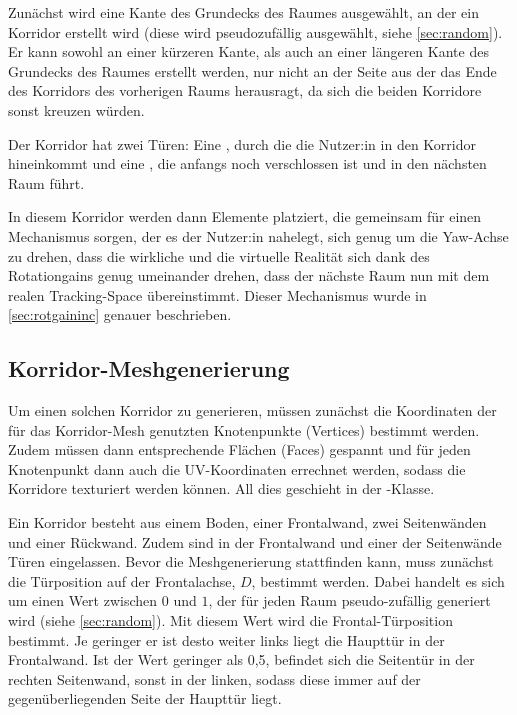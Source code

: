 Zunächst wird eine Kante des Grundecks des Raumes ausgewählt, an der ein Korridor erstellt wird (diese wird pseudozufällig ausgewählt, siehe \autoref{sec:random}). Er kann sowohl an einer kürzeren Kante, als auch an einer längeren Kante des Grundecks des Raumes erstellt werden, nur nicht an der Seite aus der das Ende des Korridors des vorherigen Raums herausragt, da sich die beiden Korridore sonst kreuzen würden.

Der Korridor hat zwei Türen: Eine , durch die die Nutzer:in in den Korridor hineinkommt und eine , die anfangs noch verschlossen ist und in den nächsten Raum führt. %

In diesem Korridor werden dann Elemente platziert, die gemeinsam für einen Mechanismus sorgen, der es der Nutzer:in nahelegt, sich genug um die Yaw-Achse zu drehen, dass die wirkliche und die virtuelle Realität sich dank des Rotationgains genug umeinander drehen, dass der nächste Raum nun mit dem realen Tracking-Space übereinstimmt. Dieser Mechanismus wurde in
\autoref{sec:rotgaininc}
genauer beschrieben.

\subsection{Korridor-Meshgenerierung}
\label{subsec:corridormesh}
Um einen solchen Korridor zu generieren, müssen zunächst die Koordinaten der  für das Korridor-Mesh genutzten Knotenpunkte (Vertices) bestimmt werden. Zudem müssen dann entsprechende Flächen (Faces) gespannt und für jeden Knotenpunkt dann auch die UV-Koordinaten errechnet werden, sodass die Korridore texturiert werden können. All dies geschieht in der -Klasse.

Ein Korridor besteht aus einem Boden, einer Frontalwand, zwei Seitenwänden und einer Rückwand. Zudem sind in der Frontalwand und einer der Seitenwände Türen eingelassen.
Bevor die Meshgenerierung stattfinden kann, muss zunächst die Türposition auf der Frontalachse, $D$, bestimmt werden. Dabei handelt es sich um einen Wert zwischen $0$ und $1$, der für jeden Raum pseudo-zufällig generiert wird (siehe \autoref{sec:random}). Mit diesem Wert wird die Frontal-Türposition bestimmt. Je geringer er ist desto weiter links liegt die Haupttür in der Frontalwand. Ist der Wert geringer als 0,5, befindet sich die Seitentür in der rechten Seitenwand, sonst in der linken, sodass diese immer auf der gegenüberliegenden Seite der Haupttür liegt.

